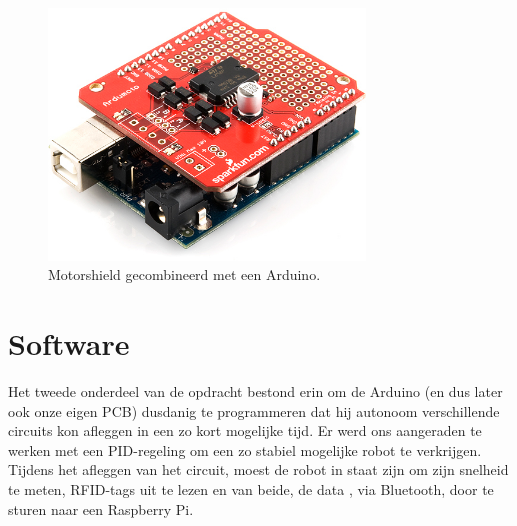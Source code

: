 \begin{figure}[H]
\centering
\includegraphics[width=0.75\textwidth]{ArduMoto.png}
\caption{Motorshield gecombineerd met een Arduino. \label{fig:ArduMoto}}
\end{figure}

\section{Software}
Het tweede onderdeel van de opdracht bestond erin om de Arduino (en dus later ook onze eigen PCB) dusdanig te programmeren dat hij autonoom verschillende circuits kon afleggen in een zo kort mogelijke tijd. Er werd ons aangeraden te werken met een PID-regeling om een zo stabiel mogelijke robot te verkrijgen. Tijdens het afleggen van het circuit, moest de robot in staat zijn om zijn snelheid te meten, RFID-tags uit te lezen en van beide, de data , via Bluetooth, door te sturen naar een Raspberry Pi.
 



